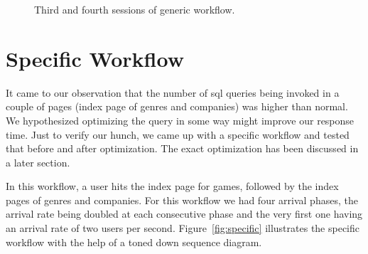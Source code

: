 \begin{figure}

\caption{Third and fourth sessions of generic workflow.}\label{fig:generic2}
\end{figure}

\section{Specific Workflow}\label{sec:specific-workflow}
It came to our observation that the number of sql queries being invoked in a couple of pages (index page of genres and companies) was higher than normal. We hypothesized optimizing the query in some way might improve our response time. Just to verify our hunch, we came up with a specific workflow and tested that before and after optimization. The exact optimization has been discussed in a later section.

In this workflow, a user hits the index page for games, followed by the index pages of genres and companies. For this workflow we had four arrival phases, the arrival rate being doubled at each consecutive phase and the very first one having an arrival rate of two users per second. Figure~\ref{fig:specific} illustrates the specific workflow with the help of a toned down sequence diagram.

